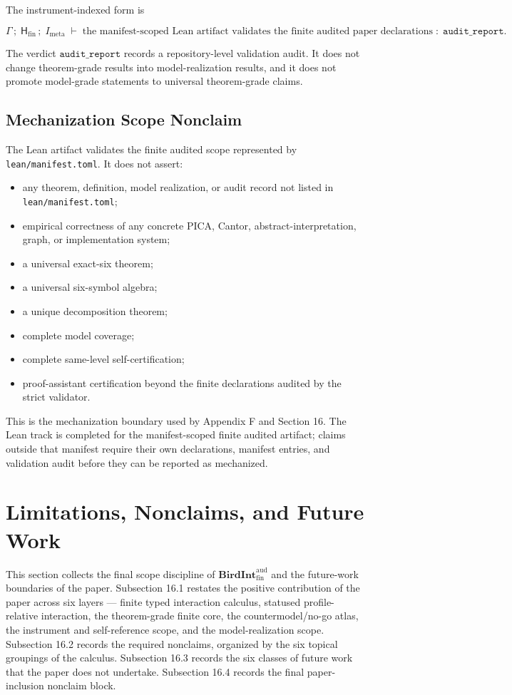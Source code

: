 \documentclass[11pt]{article}
\providecommand{\tightlist}{}
\theoremstyle{definition}
\begin{document}
The instrument-indexed form is

\[
\Gamma\,;\;\mathsf H_{\mathrm{fin}}\,;\;I_{\mathrm{meta}}\;\vdash\;\text{the manifest-scoped Lean artifact validates the finite audited paper declarations}\;:\;\texttt{audit\_report}.
\]

The verdict \(\texttt{audit\_report}\) records a repository-level validation audit. It does not change theorem-grade results into model-realization results, and it does not promote model-grade statements to universal theorem-grade claims.

\subsection{Mechanization Scope Nonclaim}

The Lean artifact validates the finite audited scope represented by \texttt{lean/manifest.toml}. It does not assert:

\begin{itemize}
\tightlist
\item
  any theorem, definition, model realization, or audit record not listed in \texttt{lean/manifest.toml};
\item
  empirical correctness of any concrete PICA, Cantor, abstract-interpretation, graph, or implementation system;
\item
  a universal exact-six theorem;
\item
  a universal six-symbol algebra;
\item
  a unique decomposition theorem;
\item
  complete model coverage;
\item
  complete same-level self-certification;
\item
  proof-assistant certification beyond the finite declarations audited by the strict validator.
\end{itemize}

This is the mechanization boundary used by Appendix F and Section 16. The Lean track is completed for the manifest-scoped finite audited artifact; claims outside that manifest require their own declarations, manifest entries, and validation audit before they can be reported as mechanized.
 \section{Limitations, Nonclaims, and Future Work}

This section collects the final scope discipline of \(\mathbf{BirdInt}^{\mathrm{aud}}_{\mathrm{fin}}\) and the future-work boundaries of the paper. Subsection 16.1 restates the positive contribution of the paper across six layers --- finite typed interaction calculus, statused profile-relative interaction, the theorem-grade finite core, the countermodel/no-go atlas, the instrument and self-reference scope, and the model-realization scope. Subsection 16.2 records the required nonclaims, organized by the six topical groupings of the calculus. Subsection 16.3 records the six classes of future work that the paper does not undertake. Subsection 16.4 records the final paper-inclusion nonclaim block.
\end{document}
